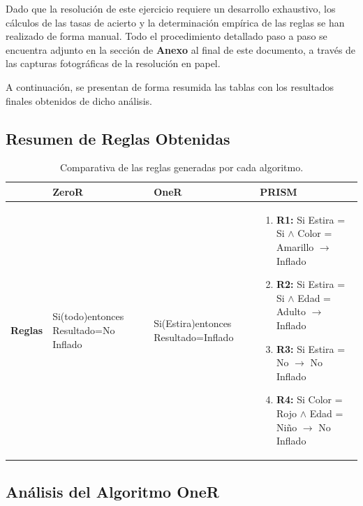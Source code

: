 \documentclass{article}
\begin{document}
\vspace{0.5cm}

Dado que la resolución de este ejercicio requiere un desarrollo exhaustivo, los cálculos de las tasas de acierto y la determinación empírica de las reglas se han realizado de forma manual. Todo el procedimiento detallado paso a paso se encuentra adjunto en la sección de \textbf{Anexo} al final de este documento, a través de las capturas fotográficas de la resolución en papel.

A continuación, se presentan de forma resumida las tablas con los resultados finales obtenidos de dicho análisis.

\subsection*{Resumen de Reglas Obtenidas}

\begin{table}[H]
    \centering
    \renewcommand{\arraystretch}{1.5}
    \begin{tabular}{|l|p{4cm}|p{4cm}|p{4cm}|}
        \hline
        & \textbf{ZeroR} & \textbf{OneR} & \textbf{PRISM} \\ \hline
        \textbf{Reglas} 
        & Si(todo)entonces Resultado=No Inflado
        & Si(Estira)entonces Resultado=Inflado
        & \begin{enumerate}
            \item \textbf{R1:} Si Estira = Si $\land$ Color = Amarillo $\rightarrow$ Inflado
            \item \textbf{R2:} Si Estira = Si $\land$ Edad = Adulto $\rightarrow$ Inflado
            \item \textbf{R3:} Si Estira = No $\rightarrow$ No Inflado
            \item \textbf{R4:} Si Color = Rojo $\land$ Edad = Niño $\rightarrow$ No Inflado
        \end{enumerate} \\ \hline
    \end{tabular}
    \caption{Comparativa de las reglas generadas por cada algoritmo.}
\end{table}

\subsection*{Análisis del Algoritmo OneR}
\end{document}
